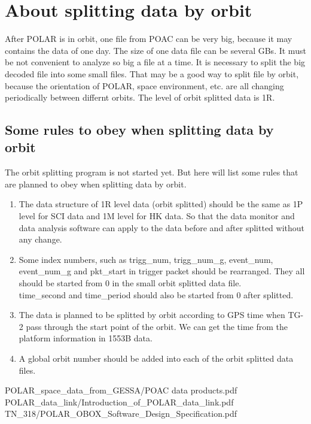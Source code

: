 \documentclass[a4paper, 12pt, onecolumn]{article}
\begin{document}
\newpage

\section{About splitting data by orbit}
After POLAR is in orbit, one file from POAC can be very big, because it may contains the data of one day.
The size of one data file can be several GBs. It must be not convenient to analyze so big a file at a time.
It is necessary to split the big decoded file into some small files. That may be a good way to split file by orbit,
because the orientation of POLAR, space environment, etc. are all changing periodically between differnt orbits.
The level of orbit splitted data is 1R.

\subsection{Some rules to obey when splitting data by orbit}
The orbit splitting program is not started yet. But here will list some rules that are planned to obey when splitting data by orbit.

\begin{enumerate}
\item The data structure of 1R level data (orbit splitted) should be the same as 1P level for SCI data and 1M level for HK data.
  So that the data monitor and data analysis software can apply to the data before and after splitted without any change.
\item Some index numbers, such as trigg\_num, trigg\_num\_g, event\_num, \\ event\_num\_g and pkt\_start in trigger packet should be rearranged.
  They all should be started from 0 in the small orbit splitted data file. \\ time\_second and time\_period should also be started from 0 after splitted.
\item The data is planned to be splitted by orbit according to GPS time when TG-2 pass through the start point of the orbit.
  We can get the time from the platform information in 1553B data.
\item A global orbit number should be added into each of the orbit splitted data files.
\end{enumerate}

\begin{thebibliography}{9}
 POLAR\_space\_data\_from\_GESSA/POAC data products.pdf
 POLAR\_data\_link/Introduction\_of\_POLAR\_data\_link.pdf
 TN\_318/POLAR\_OBOX\_Software\_Design\_Specification.pdf
\end{thebibliography}
\end{document}
